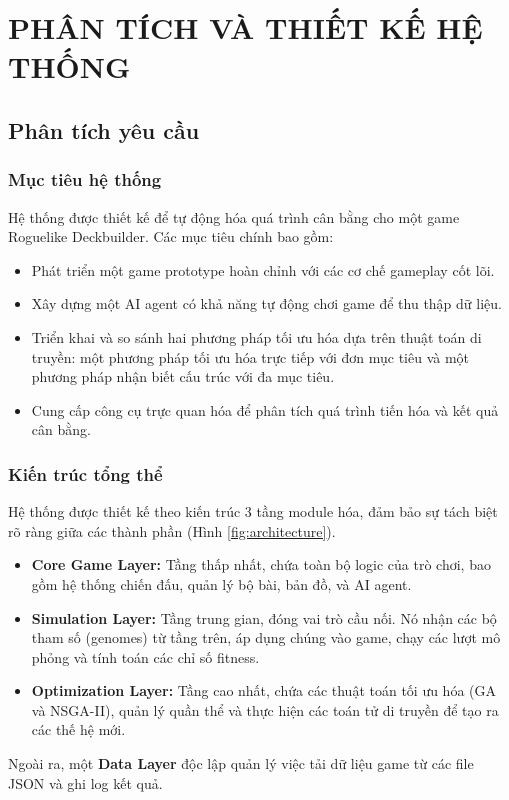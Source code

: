 \clearpage
{}
\chapter{PHÂN TÍCH VÀ THIẾT KẾ HỆ THỐNG}

\section{Phân tích yêu cầu}

\subsection{Mục tiêu hệ thống}
Hệ thống được thiết kế để tự động hóa quá trình cân bằng cho một game Roguelike Deckbuilder. Các mục tiêu chính bao gồm:
\begin{itemize}
    \item Phát triển một game prototype hoàn chỉnh với các cơ chế gameplay cốt lõi.
    \item Xây dựng một AI agent có khả năng tự động chơi game để thu thập dữ liệu.
    \item Triển khai và so sánh hai phương pháp tối ưu hóa dựa trên thuật toán di truyền: một phương pháp tối ưu hóa trực tiếp với đơn mục tiêu và một phương pháp nhận biết cấu trúc với đa mục tiêu.
    \item Cung cấp công cụ trực quan hóa để phân tích quá trình tiến hóa và kết quả cân bằng.
\end{itemize}

\subsection{Kiến trúc tổng thể}
Hệ thống được thiết kế theo kiến trúc 3 tầng module hóa, đảm bảo sự tách biệt rõ ràng giữa các thành phần (Hình \ref{fig:architecture}).
\begin{itemize}
    \item \textbf{Core Game Layer:} Tầng thấp nhất, chứa toàn bộ logic của trò chơi, bao gồm hệ thống chiến đấu, quản lý bộ bài, bản đồ, và AI agent.
    \item \textbf{Simulation Layer:} Tầng trung gian, đóng vai trò cầu nối. Nó nhận các bộ tham số (genomes) từ tầng trên, áp dụng chúng vào game, chạy các lượt mô phỏng và tính toán các chỉ số fitness.
    \item \textbf{Optimization Layer:} Tầng cao nhất, chứa các thuật toán tối ưu hóa (GA và NSGA-II), quản lý quần thể và thực hiện các toán tử di truyền để tạo ra các thế hệ mới.
\end{itemize}
Ngoài ra, một \textbf{Data Layer} độc lập quản lý việc tải dữ liệu game từ các file JSON và ghi log kết quả.

